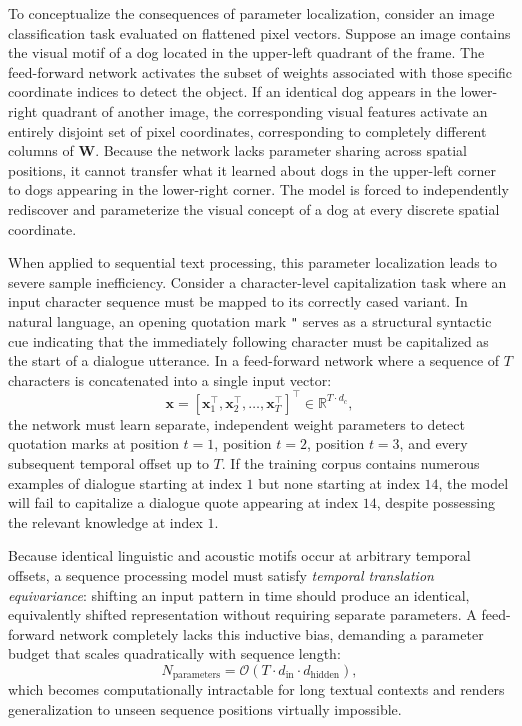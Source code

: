 \documentclass[../../../main.tex]{subfiles}
\begin{document}
To conceptualize the consequences of parameter localization, consider an image classification task evaluated on flattened pixel vectors. Suppose an image contains the visual motif of a dog located in the upper-left quadrant of the frame. The feed-forward network activates the subset of weights associated with those specific coordinate indices to detect the object. If an identical dog appears in the lower-right quadrant of another image, the corresponding visual features activate an entirely disjoint set of pixel coordinates, corresponding to completely different columns of $\mathbf{W}$. Because the network lacks parameter sharing across spatial positions, it cannot transfer what it learned about dogs in the upper-left corner to dogs appearing in the lower-right corner. The model is forced to independently rediscover and parameterize the visual concept of a dog at every discrete spatial coordinate.

When applied to sequential text processing, this parameter localization leads to severe sample inefficiency. Consider a character-level capitalization task where an input character sequence must be mapped to its correctly cased variant. In natural language, an opening quotation mark \texttt{"} serves as a structural syntactic cue indicating that the immediately following character must be capitalized as the start of a dialogue utterance. In a feed-forward network where a sequence of $T$ characters is concatenated into a single input vector:
\begin{equation}
\mathbf{x} = \left[\mathbf{x}_1^\top, \mathbf{x}_2^\top, \dots, \mathbf{x}_T^\top\right]^\top \in \mathbb{R}^{T \cdot d_c},
\end{equation}
the network must learn separate, independent weight parameters to detect quotation marks at position $t=1$, position $t=2$, position $t=3$, and every subsequent temporal offset up to $T$. If the training corpus contains numerous examples of dialogue starting at index $1$ but none starting at index $14$, the model will fail to capitalize a dialogue quote appearing at index $14$, despite possessing the relevant knowledge at index $1$.

Because identical linguistic and acoustic motifs occur at arbitrary temporal offsets, a sequence processing model must satisfy \textit{temporal translation equivariance}: shifting an input pattern in time should produce an identical, equivalently shifted representation without requiring separate parameters. A feed-forward network completely lacks this inductive bias, demanding a parameter budget that scales quadratically with sequence length:
\begin{equation}
N_{\text{parameters}} = \mathcal{O}\left(T \cdot d_{\text{in}} \cdot d_{\text{hidden}}\right),
\end{equation}
which becomes computationally intractable for long textual contexts and renders generalization to unseen sequence positions virtually impossible.
\end{document}

